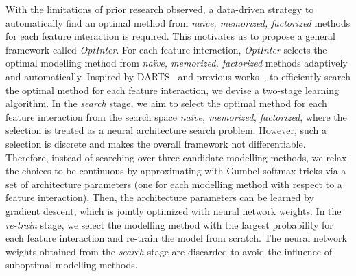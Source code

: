 \documentclass[conference]{IEEEtran}
\begin{document}
With the limitations of prior research observed, a data-driven strategy to automatically find an optimal method from \emph{naïve, memorized, factorized} methods for each feature interaction is required. This motivates us to propose a general framework called \textit{OptInter}. For each feature interaction, \textit{OptInter} selects the optimal modelling method from \emph{naïve, memorized, factorized} methods adaptively and automatically. 
Inspired by DARTS~\cite{DARTS} and previous works~\cite{AutoFis,AutoFeature},
to efficiently search the optimal method for each feature interaction, we devise a two-stage learning algorithm. 
In the \textit{search} stage, we aim to select the optimal method for each feature interaction from the search space \emph{naïve, memorized, factorized}, where the selection is treated as a neural architecture search problem. 
However, such a selection is discrete and makes the overall framework not differentiable. Therefore, instead of searching over three candidate modelling methods, we relax the choices to be continuous by approximating with Gumbel-softmax tricks\cite{Gumbel-Softmax} via a set of architecture parameters (one for each modelling method with respect to a feature interaction). Then, the architecture parameters can be learned by gradient descent, which is jointly optimized with neural network weights. In the \textit{re-train} stage, we select the modelling method with the largest probability for each feature interaction and re-train the model from scratch. The neural network weights obtained from the \textit{search} stage are discarded to avoid the influence of suboptimal modelling methods. 
\end{document}
